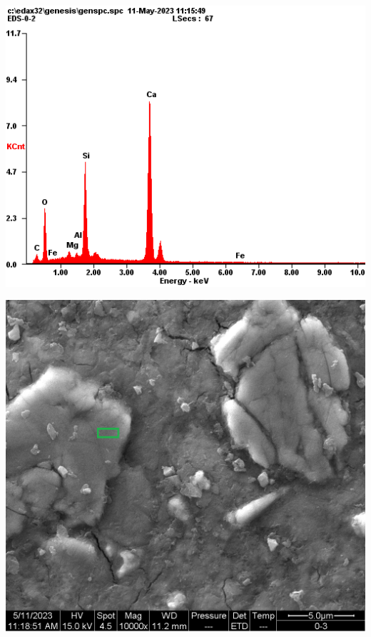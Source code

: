 \begin{minipage}{\textwidth}
  \begin{minipage}[b]{0.32\textwidth}
    \centering
    \includegraphics[width = \linewidth]{assets/spectrum/00-02-10000x-ETD-C3S.png}
  \end{minipage}
  \hfill
  \begin{minipage}[b]{0.32\textwidth}
    \centering
    \includegraphics[width = \linewidth]{assets/spectrum selection/00-02-10000x-ETD-C3S.png}

\end{minipage}
\end{minipage}
